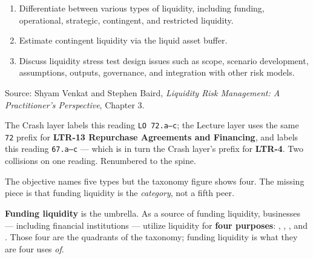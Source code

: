 
\begin{lrkeybox}
\begin{enumerate}[label=\textbf{\alph*.}]
\item Differentiate between various types of liquidity, including funding, operational, strategic, contingent, and restricted liquidity.
\item Estimate contingent liquidity via the liquid asset buffer.
\item Discuss liquidity stress test design issues such as scope, scenario development, assumptions, outputs, governance, and integration with other risk models.
\end{enumerate}
{\footnotesize\color{FRMGrey}Source: Shyam Venkat and Stephen Baird, \textit{Liquidity Risk Management: A Practitioner's Perspective}, Chapter 3.}
\end{lrkeybox}

\begin{lrtrapbox}
The Crash layer labels this reading \texttt{LO 72.a--c}; the Lecture layer uses the same \texttt{72} prefix for \textbf{LTR-13 Repurchase Agreements and Financing}, and labels this reading \texttt{67.a--c} --- which is in turn the Crash layer's prefix for \textbf{LTR-4}. Two collisions on one reading. Renumbered to the spine.
\end{lrtrapbox}


\gapbadge
{}

\begin{lrgapbox}
The objective names five types but the taxonomy figure shows four. The missing piece is that funding liquidity is the \emph{category}, not a fifth peer.
\end{lrgapbox}

\begin{lrdefbox}
\textbf{Funding liquidity} is the umbrella. As a source of funding liquidity, businesses --- including financial institutions --- utilize liquidity for \textbf{four purposes}: , , , and . Those four are the quadrants of the taxonomy; funding liquidity is what they are four uses \emph{of}.
\end{lrdefbox}

